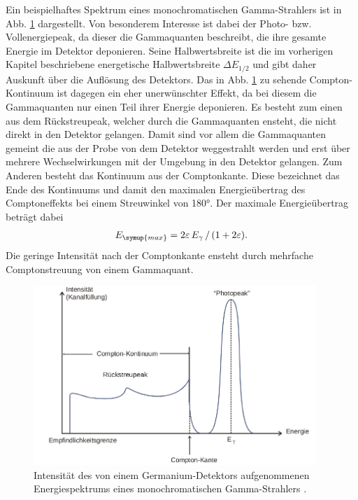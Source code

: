     Ein beispielhaftes Spektrum eines monochromatischen Gamma-Strahlers ist in Abb. \ref{fig:spektrum}
    dargestellt. Von besonderem Interesse ist dabei der Photo- bzw. Vollenergiepeak, da
    dieser die Gammaquanten beschreibt, die ihre gesamte Energie im Detektor deponieren.
    Seine Halbwertsbreite ist die im vorherigen Kapitel beschriebene energetische Halbwertsbreite
    $\Delta E_{1/2}$ und gibt daher Auskunft über die Auflösung des Detektors.
    Das in Abb. \ref{fig:spektrum} zu sehende Compton-Kontinuum ist dagegen ein eher
    unerwünschter Effekt, da bei diesem die Gammaquanten nur einen Teil ihrer Energie deponieren.
    Es besteht zum einen aus dem Rückstreupeak, welcher durch die Gammaquanten ensteht, die
    nicht direkt in den Detektor gelangen. Damit sind vor allem die Gammaquanten gemeint die
    aus der Probe von dem Detektor weggestrahlt werden und erst über mehrere
    Wechselwirkungen mit der Umgebung in den Detektor gelangen. Zum Anderen besteht das
    Kontinuum aus der Comptonkante. Diese bezeichnet das Ende des Kontinuums und damit den
    maximalen Energieübertrag des Comptoneffekts bei einem Streuwinkel von 180°. Der
    maximale Energieübertrag beträgt dabei
    \begin{align}
      E_{\symup{max}} = 2\varepsilon\,E_\gamma\,/\,(1+2\varepsilon).
    \end{align}
    Die geringe Intensität nach der Comptonkante ensteht durch mehrfache Comptonstreuung
    von einem Gammaquant.\\
    \begin{figure}
      \centering
      \includegraphics[width=0.95\textwidth]{spektrum.png}
      \caption{Intensität des von einem Germanium-Detektors aufgenommenen
       Energiespektrums eines monochromatischen Gamma-Strahlers  \cite{anleitungv18}.}
      \label{fig:spektrum}
    \end{figure}

